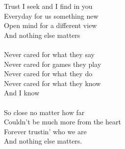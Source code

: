 \begin{multicols}{2}
Trust I seek and I find in you\\
Everyday for us something new\\
Open mind for a different view\\
And nothing else matters\\
\\
Never cared for what they say\\
Never cared for games they play\\
Never cared for what they do\\
Never cared for what they know\\
And I know\\
\\
So close no matter how far\\
Couldn't be much more from the heart\\
Forever trustin' who we are\\
And nothing else matters.\\
\end{multicols}